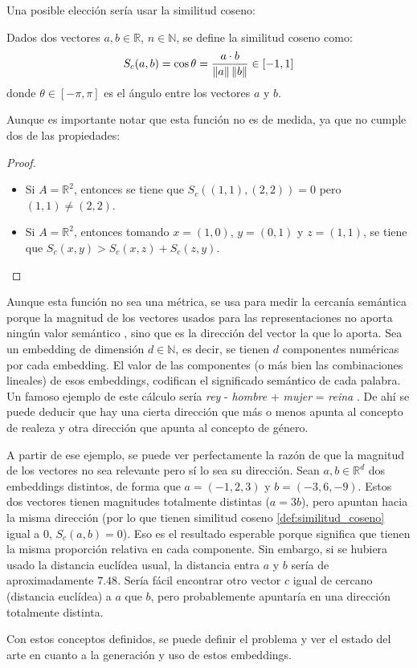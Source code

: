 Una posible elección sería usar la similitud coseno:

\begin{definition}\label{def:similitud_coseno}
  Dados dos vectores $a,b\in\mathbb{R}$, $n\in\mathbb{N}$, se define la similitud coseno como:
  \[
    S_c(a,b)=\cos\theta = \frac{a\cdot b}{\left\lVert a\right\rVert\left\lVert b\right\rVert} \in [-1, 1]
  \]
donde $\theta\in[-\pi,\pi]$ es el ángulo entre los vectores $a$ y $b$.
\end{definition}

Aunque es importante notar que esta función no es de medida, ya que no cumple dos de las propiedades:
\begin{proof}
    $ $
    \begin{itemize}
    \item Si $A=\mathbb{R}^2$, entonces se tiene que $S_c\left( (1,1), (2,2) \right) = 0$ pero $(1,1)\neq (2,2)$.
    \item Si $A=\mathbb{R}^2$, entonces tomando $x=(1,0)$, $y=(0,1)$ y $z=(1,1)$, se tiene que $S_c\left( x, y \right) > S_c(x,z) + S_c(z,y)$.
    \end{itemize}
\end{proof}

Aunque esta función no sea una métrica, se usa para medir la cercanía semántica porque la magnitud de los vectores usados para las representaciones no aporta
ningún valor semántico \cite{landauer1997learning}, sino que es la dirección del vector la que lo aporta. Sea un embedding de dimensión $d\in\mathbb{N}$, es decir,
se tienen $d$ componentes numéricas por cada embedding. El valor de las componentes (o más bien las combinaciones lineales) de esos embeddings,
codifican el significado semántico de cada palabra. Un famoso ejemplo de este cálculo sería \emph{rey} - \emph{hombre} + \emph{mujer} = \emph{reina} \cite{drozd-etal-2016-word}.
De ahí se puede deducir que hay una cierta dirección que más o menos apunta al concepto de realeza y otra dirección que apunta al concepto de género.

A partir de ese ejemplo, se puede ver perfectamente la razón de que la magnitud de los vectores no sea relevante pero sí lo sea su dirección. Sean $a,b\in\mathbb{R}^d$ dos embeddings
distintos, de forma que $a=(-1, 2, 3)$ y $b=(-3, 6, -9)$. Estos dos vectores tienen magnitudes totalmente distintas ($a=3b$), pero apuntan hacia la misma dirección
(por lo que tienen similitud coseno \ref{def:similitud_coseno} igual a 0, $S_c(a,b)=0$). Eso es el resultado esperable porque significa que tienen la misma proporción relativa en cada componente.
Sin embargo, si se hubiera usado la distancia euclídea usual, la distancia entra $a$ y $b$ sería de aproximadamente $7.48$. Sería fácil encontrar otro vector $c$ igual de cercano (distancia euclídea) a $a$
que $b$, pero probablemente apuntaría en una dirección totalmente distinta.

Con estos conceptos definidos, se puede definir el problema y ver el estado del arte en cuanto a la generación y uso de estos embeddings.